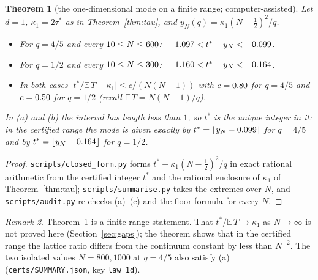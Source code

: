 \documentclass[11pt,a4paper]{article}
\newtheorem{theorem}{Theorem}
\theoremstyle{definition}
\theoremstyle{remark}
\newtheorem{remark}[theorem]{Remark}
\begin{document}
\begin{theorem}[the one-dimensional mode on a finite range; computer-assisted]\label{thm:1dlaw}
Let $d=1$, $\kappa_1=2\tau^*$ as in Theorem~\ref{thm:tau}, and $y_N(q)=\kappa_1(N-\frac12)^2/q$.
\begin{itemize}
\item[(a)] For $q=4/5$ and every $10\le N\le600$: $\ \DeltaLoF<t^*-y_N<\DeltaHiF$.
\item[(b)] For $q=1/2$ and every $10\le N\le300$: $\ \DeltaLoH<t^*-y_N<\DeltaHiH$.
\item[(c)] In both cases $\bigl|t^*/\mathbb E\,T-\kappa_1\bigr|\le c/(N(N-1))$ with $c=0.80$ for $q=4/5$ and $c=0.50$ for $q=1/2$ (recall $\mathbb E\,T=N(N-1)/q$).
\end{itemize}
In (a) and (b) the interval has length less than $1$, so $t^*$ is the unique integer in it: in the certified range the mode is given exactly by $t^*=\lfloor y_N-0.099\rfloor$ for $q=4/5$ and by $t^*=\lfloor y_N-0.164\rfloor$ for $q=1/2$.
\end{theorem}
\begin{proof}
\texttt{scripts/closed\_form.py} forms $t^*-\kappa_1(N-\frac12)^2/q$ in exact rational arithmetic from the certified integer $t^*$ and the rational enclosure of $\kappa_1$ of Theorem~\ref{thm:tau}; \texttt{scripts/summarise.py} takes the extremes over $N$, and \texttt{scripts/audit.py} re-checks (a)--(c) and the floor formula for every $N$.
\end{proof}

\begin{remark}
Theorem~\ref{thm:1dlaw} is a finite-range statement. That $t^*/\mathbb E\,T\to\kappa_1$ as $N\to\infty$ is not proved here (Section~\ref{sec:gaps}); the theorem shows that in the certified range the lattice ratio differs from the continuum constant by less than $N^{-2}$. The two isolated values $N=800,1000$ at $q=4/5$ also satisfy (a) (\texttt{certs/SUMMARY.json}, key \texttt{law\_1d}).
\end{remark}
\end{document}
